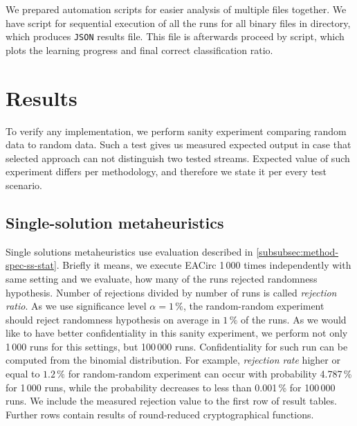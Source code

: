 \documentclass[
  print, %
  Table,   %
  nolof,     %
  nolot,     %
  11pt, %
  oneside  %
]{fithesis3}
\begin{document}
We prepared automation scripts for easier analysis of multiple files together. We have script for sequential execution of all the runs for all binary files in directory, which produces \texttt{JSON} results file. This file is afterwards proceed by script, which plots the learning progress and final correct classification ratio.


\chapter{Results}
\label{chap:res}

To verify any implementation, we perform sanity experiment comparing random data to random data. Such a test gives us measured expected output in case that selected approach can not distinguish two tested streams. Expected value of such experiment differs per methodology, and therefore we state it per every test scenario.

\section{Single-solution metaheuristics}
\label{sec:res-ss}


Single solutions metaheuristics use evaluation described in \cref{subsubsec:method-spec-ss-stat}. Briefly it means, we execute EACirc 1\,000 times independently with same setting and we evaluate, how many of the runs rejected randomness hypothesis. Number of rejections divided by number of runs is called \textit{rejection ratio}. As we use significance level $\alpha=1\,\%$, the random-random experiment should reject randomness hypothesis on average in $1\,\%$ of the runs. As we would like to have better confidentiality in this sanity experiment, we perform not only 1\,000 runs for this settings, but 100\,000 runs. Confidentiality for such run can be computed from the binomial distribution. For example, \textit{rejection rate} higher or equal to $1.2\,\%$ for random-random experiment can occur with probability 4.787\,\% for 1\,000 runs, while the probability decreases to less than 0.001\,\% for 100\,000 runs. We include the measured rejection value to the first row of result tables. Further rows contain results of round-reduced cryptographical functions.
\end{document}
